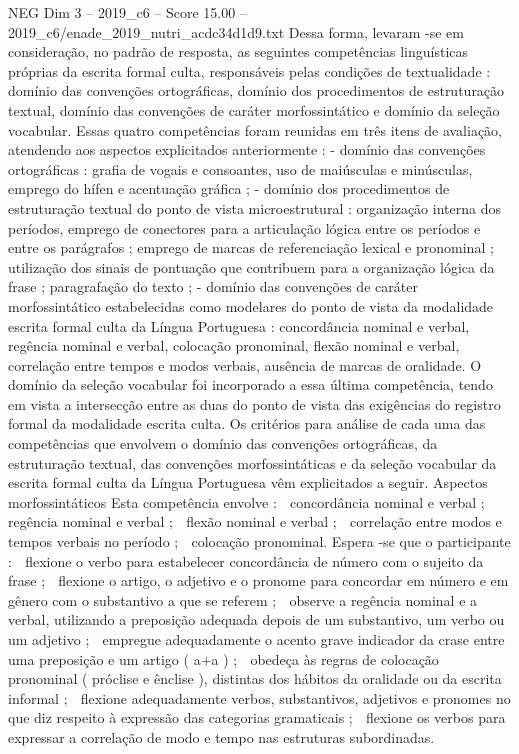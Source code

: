 \begin{textsample}{NEG Dim 3 – 2019\_c6 – Score 15.00 – 2019\_c6/enade\_2019\_nutri\_acdc34d1d9.txt}
Dessa forma, levaram -se em consideração, no padrão de resposta, as seguintes competências linguísticas próprias da escrita formal culta, responsáveis pelas condições de textualidade : domínio das convenções ortográficas, domínio dos procedimentos de estruturação textual, domínio das convenções de caráter morfossintático e domínio da seleção vocabular.
Essas quatro competências foram reunidas em três itens de avaliação, atendendo aos aspectos explicitados anteriormente : - domínio das convenções ortográficas : grafia de vogais e consoantes, uso de maiúsculas e minúsculas, emprego do hífen e acentuação gráfica ; - domínio dos procedimentos de estruturação textual do ponto de vista microestrutural : organização interna dos períodos, emprego de conectores para a articulação lógica entre os períodos e entre os parágrafos ; emprego de marcas de referenciação lexical e pronominal ; utilização dos sinais de pontuação que contribuem para a organização lógica da frase ; paragrafação do texto ; - domínio das convenções de caráter morfossintático estabelecidas como modelares do ponto de vista da modalidade escrita formal culta da Língua Portuguesa : concordância nominal e verbal, regência nominal e verbal, colocação pronominal, flexão nominal e verbal, correlação entre tempos e modos verbais, ausência de marcas de oralidade.
O domínio da seleção vocabular foi incorporado a essa última competência, tendo em vista a intersecção entre as duas do ponto de vista das exigências do registro formal da modalidade escrita culta.
Os critérios para análise de cada uma das competências que envolvem o domínio das convenções ortográficas, da estruturação textual, das convenções morfossintáticas e da seleção vocabular da escrita formal culta da Língua Portuguesa vêm explicitados a seguir.
Aspectos morfossintáticos Esta competência envolve :  concordância nominal e verbal ;  regência nominal e verbal ;  flexão nominal e verbal ;  correlação entre modos e tempos verbais no período ;  colocação pronominal.
Espera -se que o participante :  flexione o verbo para estabelecer concordância de número com o sujeito da frase ;  flexione o artigo, o adjetivo e o pronome para concordar em número e em gênero com o substantivo a que se referem ;  observe a regência nominal e a verbal, utilizando a preposição adequada depois de um substantivo, um verbo ou um adjetivo ;  empregue adequadamente o acento grave indicador da crase entre uma preposição e um artigo ( a+a ) ;  obedeça às regras de colocação pronominal ( próclise e ênclise ), distintas dos hábitos da oralidade ou da escrita informal ;  flexione adequadamente verbos, substantivos, adjetivos e pronomes no que diz respeito à expressão das categorias gramaticais ;  flexione os verbos para expressar a correlação de modo e tempo nas estruturas subordinadas.

\end{textsample}
